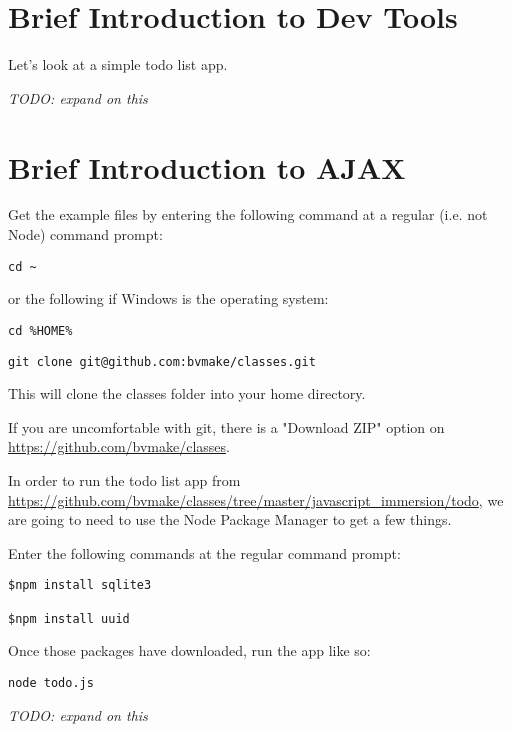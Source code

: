 \documentclass{article}
\begin{document}
\section{Brief Introduction to Dev Tools}
Let's look at a simple todo list app.

\emph{TODO: expand on this}

\section{Brief Introduction to AJAX}

Get the example files by entering the following command at a regular (i.e. not Node) command prompt:

\begin{lstlisting}
cd ~
\end{lstlisting}

or the following if Windows is the operating system:

\begin{lstlisting}
cd %HOME%
\end{lstlisting}

\begin{lstlisting}
git clone git@github.com:bvmake/classes.git
\end{lstlisting}

This will clone the classes folder into your home directory.

If you are uncomfortable with git, there is a "Download ZIP" option on \url{https://github.com/bvmake/classes}.

In order to run the todo list app from \url{https://github.com/bvmake/classes/tree/master/javascript_immersion/todo}, we are going to need to use the Node Package Manager to get a few things.

Enter the following commands at the regular command prompt:

\begin{lstlisting}
$npm install sqlite3

$npm install uuid
\end{lstlisting}

Once those packages have downloaded, run the app like so:

\begin{lstlisting}
node todo.js
\end{lstlisting}

\emph{TODO: expand on this}
\end{document}
